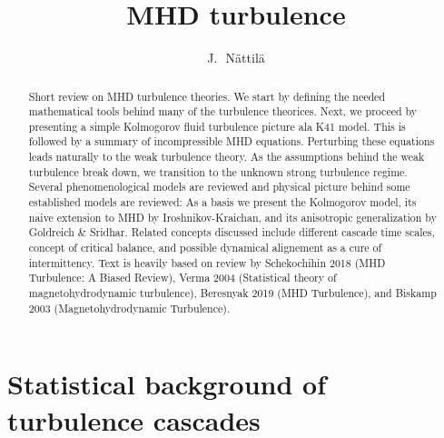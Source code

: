 \documentclass[usenatbib,twocolumn]{aastex63}
\begin{document}
\title{MHD turbulence}

\author{J.~\,N\"attil\"a}



\begin{abstract}
    Short review on MHD turbulence theories.
    We start by defining the needed mathematical tools behind many of the turbulence theorices.
    Next, we proceed by presenting a simple Kolmogorov fluid turbulence picture ala K41 model.
    This is followed by a summary of incompressible MHD equations.
    Perturbing these equations leads naturally to the weak turbulence theory.
    As the assumptions behind the weak turbulence break down, we transition to the unknown strong turbulence regime.
    Several phenomenological models are reviewed and physical picture behind some established models are reviewed:
    As a basis we present the Kolmogorov model, its naive extension to MHD by Iroshnikov-Kraichan, and its anisotropic generalization by Goldreich \& Sridhar.
    Related concepts discussed include different cascade time scales, concept of critical balance, and possible dynamical alignement as a cure of intermittency.
    Text is heavily based on review by Schekochihin 2018 (MHD Turbulence: A Biased Review), Verma 2004 (Statistical theory of magnetohydrodynamic turbulence), Beresnyak 2019 (MHD Turbulence), and Biskamp 2003 (Magnetohydrodynamic Turbulence).
\end{abstract}






\section{Statistical background of turbulence cascades}\label{sect:turb}
\end{document}
